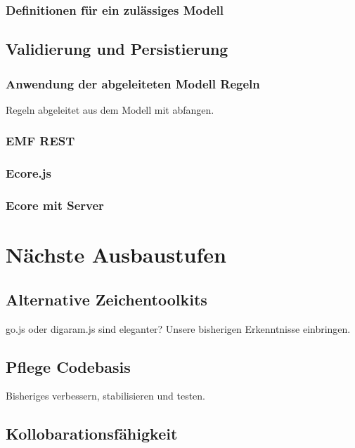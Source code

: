 \subsubsection{Definitionen für ein zulässiges Modell}


\subsection{Validierung und Persistierung}

\subsubsection{Anwendung der abgeleiteten Modell Regeln}

Regeln abgeleitet aus dem Modell mit \dd abfangen.

\subsubsection{EMF REST}

\subsubsection{Ecore.js}

\subsubsection{Ecore mit Server}


\section{Nächste Ausbaustufen}

\subsection{Alternative Zeichentoolkits}

go.js oder digaram.js sind eleganter?
Unsere bisherigen Erkenntnisse einbringen.

\subsection{Pflege Codebasis}

Bisheriges verbessern, stabilisieren und testen.

\subsection{Kollobarationsfähigkeit}


